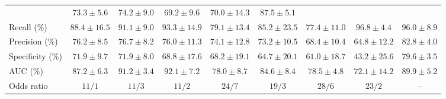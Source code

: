 \begin{tabular}{lcccccccc}
& ${73.3 \pm 5.6}$
& ${74.2 \pm 9.0}$
& ${69.2 \pm 9.6}$
& ${70.0 \pm 14.3}$
& ${\mathbf{87.5 \pm 5.1}}$\\
Recall (\%)
& ${88.4 \pm 16.5}$
& ${91.1 \pm 9.0}$
& ${93.3 \pm 14.9}$
& ${79.1 \pm 13.4}$
& ${85.2 \pm 23.5}$
& ${77.4 \pm 11.0}$
& ${\mathbf{96.8 \pm 4.4}}$
& ${96.0 \pm 8.9}$\\
Precision (\%)
& ${76.2 \pm 8.5}$
& ${76.7 \pm 8.2}$
& ${76.0 \pm 11.3}$
& ${74.1 \pm 12.8}$
& ${73.2 \pm 10.5}$
& ${68.4 \pm 10.4}$
& ${64.8 \pm 12.2}$
& ${\mathbf{82.8 \pm 4.0}}$\\
Specificity (\%)
& ${71.9 \pm 9.7}$
& ${71.9 \pm 8.0}$
& ${68.8 \pm 17.6}$
& ${68.2 \pm 19.1}$
& ${64.7 \pm 20.1}$
& ${61.0 \pm 18.7}$
& ${43.2 \pm 25.6}$
& ${\mathbf{79.6 \pm 3.5}}$\\
AUC (\%)
& ${87.2 \pm 6.3}$
& ${91.2 \pm 3.4}$
& ${\mathbf{92.1 \pm 7.2}}$
& ${78.0 \pm 8.7}$
& ${84.6 \pm 8.4}$
& ${78.5 \pm 4.8}$
& ${72.1 \pm 14.2}$
& ${89.9 \pm 5.2}$\\
Odds ratio
& \cellcolor{lightgray}${11/1}$
& ${11/3}$
& \cellcolor{lightgray}${11/2}$
& \cellcolor{lightgray}${24/7}$
& \cellcolor{lightgray}${19/3}$
& \cellcolor{lightgray}${28/6}$
& \cellcolor{lightgray}${23/2}$
& --\\
\bottomrule
\end{tabular}